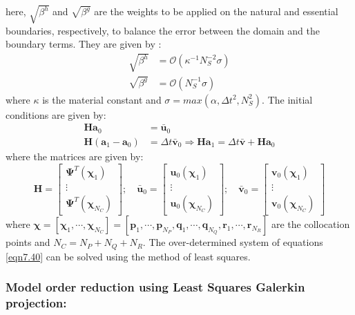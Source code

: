 \documentclass[10pt,letterpaper, onecolumn]{article}
\begin{document}
%
here, $\sqrt{\beta^h}$ and $\sqrt{\beta^g}$ are the weights to be applied on the natural and essential boundaries, respectively, to balance the error between the domain and the boundary terms. They are given by \cite{chi2013dispersion}: 
%
\begin{subequations}
\begin{align}
\sqrt{\beta^h} &=  \mathcal{O}(\kappa^{-1} N_S^{-2} \sigma) \\
\sqrt{\beta^g} &=  \mathcal{O}(N_S^{-1} \sigma)
\end{align}
\end{subequations}
%
where $\kappa$ is the material constant and $ \sigma  = max(\alpha, \Delta t^2, N_S^2)$. The initial conditions are given by:
%
\begin{subequations}
\begin{align}
\bm{H} \bm{a}_0 &= \bar{\bm{u}}_0 \\
\bm{H} (\bm{a}_1 - \bm{a}_0) &= \Delta t  \bar{\bm{v}}_0 \Rightarrow \bm{H} \bm{a}_1 =  \Delta t \bar{\bm{v}} + \bm{H} \bm{a}_0
\end{align}
\end{subequations}
%
where the matrices are given by:
%
\begin{equation}
\bm{H} = \begin{bmatrix}   \bm{\Psi}^T(\bm{\chi}_1)  \\ \vdots \\  \bm{\Psi}^T(\bm{\chi}_{N_C})  \end{bmatrix}; \quad 
\bar{\bm{u}}_0 = \begin{bmatrix}  \bm{u}_0(\bm{\chi}_1) \\ \vdots \\  \bm{u}_0(\bm{\chi}_{N_C}) \end{bmatrix}; \quad
\bar{\bm{v}}_0 = \begin{bmatrix}   \bm{v}_0(\bm{\chi}_1) \\ \vdots \\  \bm{v}_0(\bm{\chi}_{N_C})   \end{bmatrix}
\end{equation}
%
where $\bm{\chi} = [\bm{\chi}_1, \cdots, \bm{\chi}_{N_C}] =  \left[ \bm{p}_1, \cdots, \bm{p}_{N_P}, \bm{q}_1, \cdots, \bm{q}_{N_Q}, \bm{r}_1, \cdots, \bm{r}_{N_R} \right]$ are the collocation points and $N_C = N_P + N_Q + N_R$. The over-determined system of equations \eqref{eqn7.40} can be solved using the method of least squares. 

\subsubsection{Model order reduction using Least Squares Galerkin projection:}
\end{document}
